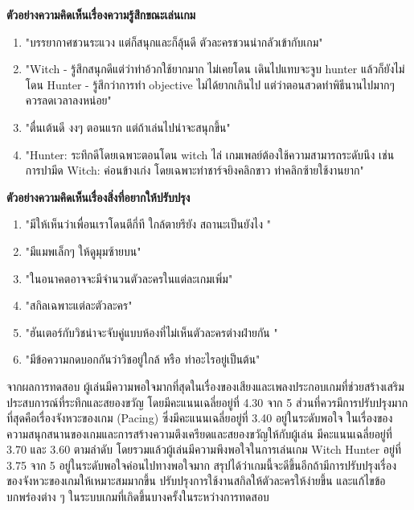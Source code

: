\pagebreak

\textbf{ตัวอย่างความคิดเห็นเรื่องความรู้สึกขณะเล่นเกม}
\begin{enumerate}
    \item "บรรยากาศชวนระแวง แต่ก็สนุกและก็ลุ้นดี ตัวละครชวนน่ากลัวเข้ากับเกม"
    \item "Witch - รู้สึกสนุกดีแต่ว่าท่าอ้วกใช้ยากมาก ไม่เคยโดน เดินไปแทบจะจูบ hunter แล้วก็ยังไม่โดน
    Hunter - รู้สึกว่าการทำ objective ไม่ได้ยากเกินไป แต่ว่าตอนสวดทำพิธีนานไปมากๆ ควรลดเวลาลงหน่อย"
    \item "ตื่นเต้นดี งงๆ ตอนแรก แต่ถ้าเล่นไปน่าจะสนุกขึ้น"
    \item "Hunter: ระทึกดีโดยเฉพาะตอนโดน witch ไล่ เกมเพลย์ต้องใช้ความสามารถระดับนึง เช่น การปามีด
    Witch: ค่อนข้างเก่ง โดยเฉพาะท่าชาร์จยิงคลิกขาว ท่าคลิกซ้ายใช้งานยาก"
\end{enumerate}

\textbf{ตัวอย่างความคิดเห็นเรื่องสิ่งที่อยากให้ปรับปรุง}
\begin{enumerate}
    \item "มีให้เห็นว่าเพื่อนเราโดนตีกี่ที ใกล้ตายรึยัง สถานะเป็นยังไง "
    \item "มีแมพเล็กๆ  ให้ดูมุมซ้ายบน"
    \item "ในอนาคตอาจจะมีจำนวนตัวละครในแต่ละเกมเพิ่ม"
    \item "สกิลเฉพาะแต่ละตัวละคร"
    \item "ฮันเตอร์กับวิชน่าจะจับคู่แบบห้องที่ไม่เห็นตัวละครต่างฝ่ายกัน "
    \item "มีข้อความกดบอกกันว่าวิชอยู่ใกล้ หรือ ทำอะไรอยู่เป็นต้น"
\end{enumerate}

จากผลการทดสอบ ผู้เล่นมีความพอใจมากที่สุดในเรื่องของเสียงและเพลงประกอบเกมที่ช่วยสร้างเสริมประสบการณ์ที่ระทึกและสยองขวัญ
โดยมีคะแนนเฉลี่ยอยู่ที่ 4.30 จาก 5 ส่วนที่ควรมีการปรับปรุงมากที่สุดคือเรื่องจังหวะของเกม (Pacing) 
ซึ่งมีคะแนนเฉลี่ยอยู่ที่ 3.40 อยู่ในระดับพอใจ ในเรื่องของความสนุกสนานของเกมและการสร้างความตึงเครียดและสยองขวัญให้กับผู้เล่น
มีคะแนนเฉลี่ยอยู่ที่ 3.70 และ 3.60 ตามลำดับ โดยรวมแล้วผู้เล่นมีความพึงพอใจในการเล่นเกม Witch Hunter อยู่ที่ 3.75 จาก 5 อยู่ในระดับพอใจค่อนไปทางพอใจมาก
สรุปได้ว่าเกมนี้จะดีขึ้นอีกถ้ามีการปรับปรุงเรื่องของจังหวะของเกมให้เหมาะสมมากขึ้น ปรับปรุงการใช้งานสกิลให้ตัวละครให้ง่ายขึ้น และแก้ไขข้อบกพร่องต่าง
 ๆ ในระบบเกมที่เกิดขึ้นบางครั้งในระหว่างการทดสอบ
